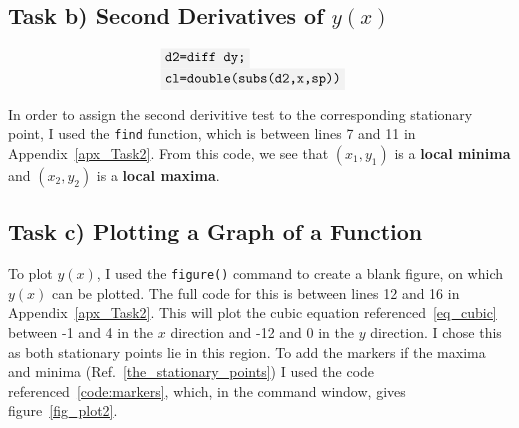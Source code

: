 \documentclass[10pt,a4paper]{article}
\newcommand{\code}[1]{\colorbox{light-gray}{\texttt{#1}}}
\begin{document}
	\subsection{Task b) Second Derivatives of $y(x)$} %
	
	\begin{equation}
	\label{code_secondder}
	\begin{array}{ll}
		\code{d2=diff dy;}& \\
		\code{cl=double(subs(d2,x,sp))}&
	\end{array}
	\end{equation}
	
	In order to assign the second derivitive test to the corresponding stationary point, I used the \code{find} function, which is between lines 7 and 11 in Appendix~\ref{apx_Task2}. From this code, we see that $(x_1, y_1)$ is a \textbf{local minima} and $(x_2, y_2)$ is a \textbf{local maxima}.
	
	\subsection{Task c) Plotting a Graph of a Function} %
	\label{section_2c}
	To plot $y(x)$, I used the \code{figure()} command to create a blank figure, on which $y(x)$ can be plotted. The full code for this is between lines 12 and 16 in Appendix~\ref{apx_Task2}. This will plot the cubic equation referenced~\ref{eq_cubic} between -1 and 4 in the $x$ direction and -12 and 0 in the $y$ direction. I chose this as both stationary points lie in this region. To add the markers if the maxima and minima (Ref.~\ref{the_stationary_points}) I used the code referenced~\ref{code:markers}, which, in the command window, gives figure~\ref{fig_plot2}.
	
\end{document}
